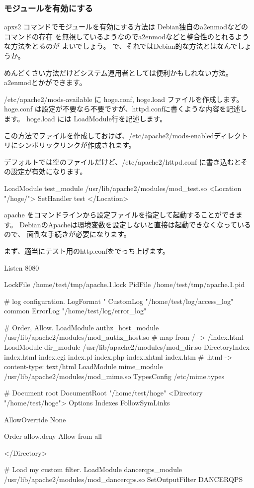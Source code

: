 \documentclass[mingoth,a4paper]{jsarticle}
\begin{document}
\subsubsection{モジュールを有効にする}

apxs2 コマンドでモジュールを有効にする方法は Debian独自のa2enmodなどのコマンドの存在
を無視しているようなのでa2enmodなどと整合性のとれるような方法をとるのが
よいでしょう。
で、それではDebian的な方法とはなんでしょうか。


めんどくさい方法だけどシステム運用者としては便利かもしれない方法。
a2enmodとかができます。

/etc/apache2/mods-available に hoge.conf, hoge.load ファイルを作成します。
hoge.conf は設定が不要なら不要ですが、httpd.confに書くような内容を記述し
ます。
hoge.load には LoadModule行を記述します。

この方法でファイルを作成しておけば、/etc/apache2/mods-enabledディレクト
リにシンボリックリンクが作成されます。


デフォルトでは空のファイルだけど、/etc/apache2/httpd.conf に書き込むとそ
の設定が有効になります。

\begin{commandline}
LoadModule test_module /usr/lib/apache2/modules/mod_test.so
<Location "/hoge/">
   SetHandler test
</Location>
\end{commandline}


apache をコマンドラインから設定ファイルを指定して起動することができます。
DebianのApacheは環境変数を設定しないと直接は起動できなくなっているので、
面倒な手続きが必要になります。

まず、適当にテスト用のhttp.confをでっち上げます。

\begin{commandline}
Listen 8080

LockFile /home/test/tmp/apache.1.lock
PidFile /home/test/tmp/apache.1.pid

# log configuration.
LogFormat "%
CustomLog "/home/test/log/access_log" common
ErrorLog "/home/test/log/error_log"

# Order, Allow.
LoadModule authz_host_module /usr/lib/apache2/modules/mod_authz_host.so
# map from / -> /index.html
LoadModule dir_module /usr/lib/apache2/modules/mod_dir.so
DirectoryIndex index.html index.cgi index.pl index.php index.xhtml index.htm
# .html -> content-type: text/html
LoadModule mime_module /usr/lib/apache2/modules/mod_mime.so
TypesConfig /etc/mime.types

# Document root
DocumentRoot "/home/test/hoge"
<Directory "/home/test/hoge">
    Options Indexes FollowSymLinks

    AllowOverride None

    Order allow,deny
    Allow from all

</Directory>

# Load my custom filter.
LoadModule dancerqps_module /usr/lib/apache2/modules/mod_dancerqps.so
SetOutputFilter DANCERQPS
\end{commandline}
\end{document}
